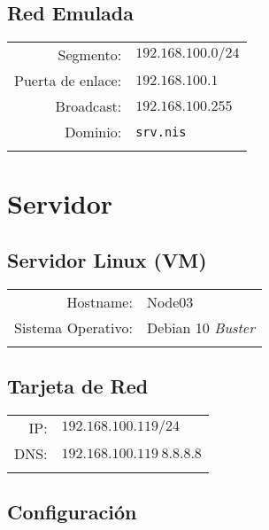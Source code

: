 \documentclass[../main.tex]{subfiles}
\begin{document}
\subsection{Red Emulada}\label{sec:red_emu}
\begin{table}[H]
  \centering
  \begin{tabular}{rl}
    \hline{}
    Segmento:&$192.168.100.0/24$\\
    Puerta de enlace:&$192.168.100.1$\\
    Broadcast:&$192.168.100.255$\\
    Dominio:&\texttt{srv.nis}\\
    \hline{}
  \end{tabular}
\end{table}

\section{Servidor}\label{sec:servidor}

\subsection{Servidor Linux (VM)}\label{sec:slvm}
\begin{table}[H]
  \centering
  \begin{tabular}{rl}
    \hline{}
    Hostname: &Node03\\
    Sistema Operativo: & Debian 10 \textit{Buster}\\
    \hline{}
  \end{tabular}
\end{table}

\subsection{Tarjeta de Red}\label{sec:tr}
\begin{table}[H]
  \centering
  \begin{tabular}{rl}
    \hline{}
    IP:&$192.168.100.119/24$\\
    DNS:&$192.168.100.119\ 8.8.8.8$\\
    \hline{}
  \end{tabular}
\end{table}

\subsection{Configuración}\label{sec:serv_conf}
\end{document}
